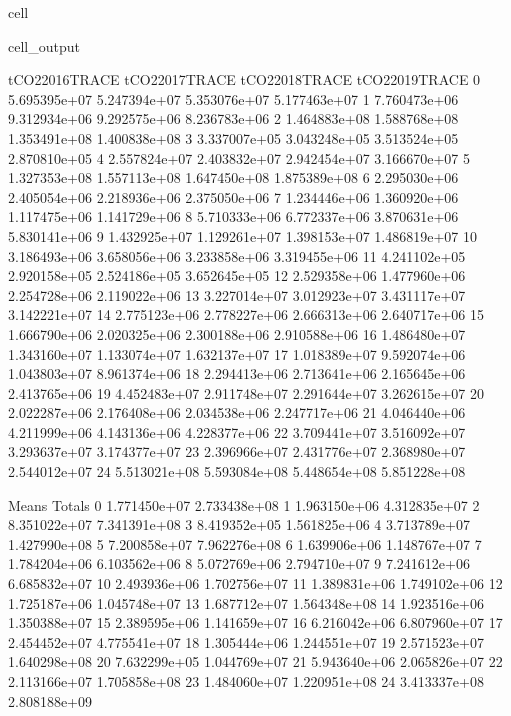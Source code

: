 \documentclass[letterpaper,10pt,english]{jupyterBook}
\begin{document}
\begin{sphinxuseclass}{cell}
\begin{sphinxVerbatimOutput}
\begin{sphinxuseclass}{cell_output}
\begin{sphinxVerbatim}[commandchars=\\\{\}]
    tCO2\PYGZus{}2016\PYGZus{}TRACE  tCO2\PYGZus{}2017\PYGZus{}TRACE  tCO2\PYGZus{}2018\PYGZus{}TRACE  tCO2\PYGZus{}2019\PYGZus{}TRACE  \PYGZbs{}
0      5.695395e+07     5.247394e+07     5.353076e+07     5.177463e+07   
1      7.760473e+06     9.312934e+06     9.292575e+06     8.236783e+06   
2      1.464883e+08     1.588768e+08     1.353491e+08     1.400838e+08   
3      3.337007e+05     3.043248e+05     3.513524e+05     2.870810e+05   
4      2.557824e+07     2.403832e+07     2.942454e+07     3.166670e+07   
5      1.327353e+08     1.557113e+08     1.647450e+08     1.875389e+08   
6      2.295030e+06     2.405054e+06     2.218936e+06     2.375050e+06   
7      1.234446e+06     1.360920e+06     1.117475e+06     1.141729e+06   
8      5.710333e+06     6.772337e+06     3.870631e+06     5.830141e+06   
9      1.432925e+07     1.129261e+07     1.398153e+07     1.486819e+07   
10     3.186493e+06     3.658056e+06     3.233858e+06     3.319455e+06   
11     4.241102e+05     2.920158e+05     2.524186e+05     3.652645e+05   
12     2.529358e+06     1.477960e+06     2.254728e+06     2.119022e+06   
13     3.227014e+07     3.012923e+07     3.431117e+07     3.142221e+07   
14     2.775123e+06     2.778227e+06     2.666313e+06     2.640717e+06   
15     1.666790e+06     2.020325e+06     2.300188e+06     2.910588e+06   
16     1.486480e+07     1.343160e+07     1.133074e+07     1.632137e+07   
17     1.018389e+07     9.592074e+06     1.043803e+07     8.961374e+06   
18     2.294413e+06     2.713641e+06     2.165645e+06     2.413765e+06   
19     4.452483e+07     2.911748e+07     2.291644e+07     3.262615e+07   
20     2.022287e+06     2.176408e+06     2.034538e+06     2.247717e+06   
21     4.046440e+06     4.211999e+06     4.143136e+06     4.228377e+06   
22     3.709441e+07     3.516092e+07     3.293637e+07     3.174377e+07   
23     2.396966e+07     2.431776e+07     2.368980e+07     2.544012e+07   
24     5.513021e+08     5.593084e+08     5.448654e+08     5.851228e+08   

           Means        Totals  
0   1.771450e+07  2.733438e+08  
1   1.963150e+06  4.312835e+07  
2   8.351022e+07  7.341391e+08  
3   8.419352e+05  1.561825e+06  
4   3.713789e+07  1.427990e+08  
5   7.200858e+07  7.962276e+08  
6   1.639906e+06  1.148767e+07  
7   1.784204e+06  6.103562e+06  
8   5.072769e+06  2.794710e+07  
9   7.241612e+06  6.685832e+07  
10  2.493936e+06  1.702756e+07  
11  1.389831e+06  1.749102e+06  
12  1.725187e+06  1.045748e+07  
13  1.687712e+07  1.564348e+08  
14  1.923516e+06  1.350388e+07  
15  2.389595e+06  1.141659e+07  
16  6.216042e+06  6.807960e+07  
17  2.454452e+07  4.775541e+07  
18  1.305444e+06  1.244551e+07  
19  2.571523e+07  1.640298e+08  
20  7.632299e+05  1.044769e+07  
21  5.943640e+06  2.065826e+07  
22  2.113166e+07  1.705858e+08  
23  1.484060e+07  1.220951e+08  
24  3.413337e+08  2.808188e+09  
\end{sphinxVerbatim}

\end{sphinxuseclass}\end{sphinxVerbatimOutput}

\end{sphinxuseclass}
\end{document}
